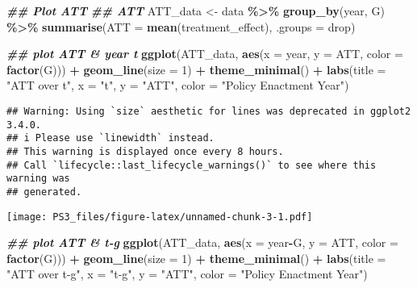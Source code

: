 \documentclass[
]{article}
\newenvironment{Shaded}{\begin{snugshade}}{\end{snugshade}}
\newcommand{\AttributeTok}[1]{\textcolor[rgb]{0.13,0.29,0.53}{#1}}
\newcommand{\DecValTok}[1]{\textcolor[rgb]{0.00,0.00,0.81}{#1}}
\newcommand{\DocumentationTok}[1]{\textcolor[rgb]{0.56,0.35,0.01}{\textbf{\textit{#1}}}}
\newcommand{\FunctionTok}[1]{\textcolor[rgb]{0.13,0.29,0.53}{\textbf{#1}}}
\newcommand{\NormalTok}[1]{#1}
\newcommand{\OtherTok}[1]{\textcolor[rgb]{0.56,0.35,0.01}{#1}}
\newcommand{\SpecialCharTok}[1]{\textcolor[rgb]{0.81,0.36,0.00}{\textbf{#1}}}
\newcommand{\StringTok}[1]{\textcolor[rgb]{0.31,0.60,0.02}{#1}}
\begin{document}
\begin{Shaded}
\begin{Highlighting}[]
\DocumentationTok{\#\# Plot ATT}
\DocumentationTok{\#\# ATT}
\NormalTok{ATT\_data }\OtherTok{\textless{}{-}}\NormalTok{ data }\SpecialCharTok{\%\textgreater{}\%}
  \FunctionTok{group\_by}\NormalTok{(year, G) }\SpecialCharTok{\%\textgreater{}\%}
  \FunctionTok{summarise}\NormalTok{(}\AttributeTok{ATT =} \FunctionTok{mean}\NormalTok{(treatment\_effect), }\AttributeTok{.groups =} \StringTok{\textquotesingle{}drop\textquotesingle{}}\NormalTok{)}


\DocumentationTok{\#\# plot ATT \& year t}
\FunctionTok{ggplot}\NormalTok{(ATT\_data, }\FunctionTok{aes}\NormalTok{(}\AttributeTok{x =}\NormalTok{ year, }\AttributeTok{y =}\NormalTok{ ATT, }\AttributeTok{color =} \FunctionTok{factor}\NormalTok{(G))) }\SpecialCharTok{+}
  \FunctionTok{geom\_line}\NormalTok{(}\AttributeTok{size =} \DecValTok{1}\NormalTok{) }\SpecialCharTok{+}
  \FunctionTok{theme\_minimal}\NormalTok{() }\SpecialCharTok{+}
  \FunctionTok{labs}\NormalTok{(}\AttributeTok{title =} \StringTok{"ATT over t"}\NormalTok{,}
       \AttributeTok{x =} \StringTok{"t"}\NormalTok{,}
       \AttributeTok{y =} \StringTok{"ATT"}\NormalTok{,}
       \AttributeTok{color =} \StringTok{"Policy Enactment Year"}\NormalTok{)}
\end{Highlighting}
\end{Shaded}

\begin{verbatim}
## Warning: Using `size` aesthetic for lines was deprecated in ggplot2 3.4.0.
## i Please use `linewidth` instead.
## This warning is displayed once every 8 hours.
## Call `lifecycle::last_lifecycle_warnings()` to see where this warning was
## generated.
\end{verbatim}

\texttt{[image: PS3\_files/figure-latex/unnamed-chunk-3-1.pdf]}

\begin{Shaded}
\begin{Highlighting}[]
\DocumentationTok{\#\# plot ATT \& t{-}g}
\FunctionTok{ggplot}\NormalTok{(ATT\_data, }\FunctionTok{aes}\NormalTok{(}\AttributeTok{x =}\NormalTok{ year}\SpecialCharTok{{-}}\NormalTok{G, }\AttributeTok{y =}\NormalTok{ ATT, }\AttributeTok{color =} \FunctionTok{factor}\NormalTok{(G))) }\SpecialCharTok{+}
  \FunctionTok{geom\_line}\NormalTok{(}\AttributeTok{size =} \DecValTok{1}\NormalTok{) }\SpecialCharTok{+}
  \FunctionTok{theme\_minimal}\NormalTok{() }\SpecialCharTok{+}
  \FunctionTok{labs}\NormalTok{(}\AttributeTok{title =} \StringTok{"ATT over t{-}g"}\NormalTok{,}
       \AttributeTok{x =} \StringTok{"t{-}g"}\NormalTok{,}
       \AttributeTok{y =} \StringTok{"ATT"}\NormalTok{,}
       \AttributeTok{color =} \StringTok{"Policy Enactment Year"}\NormalTok{)}
\end{Highlighting}
\end{Shaded}
\end{document}
